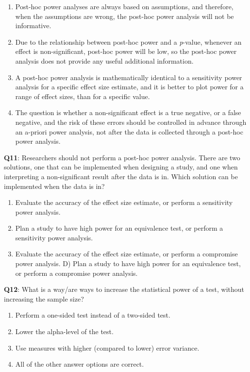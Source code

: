 \documentclass[
  oneside]{krantz}
\providecommand{\tightlist}{%
  \setlength{\itemsep}{0pt}\setlength{\parskip}{0pt}}
\begin{document}
\begin{enumerate}
\def\labelenumi{\Alph{enumi})}
\tightlist
\item
  Post-hoc power analyses are always based on assumptions, and therefore, when the assumptions are wrong, the post-hoc power analysis will not be informative.
\item
  Due to the relationship between post-hoc power and a \emph{p}-value, whenever an effect is non-significant, post-hoc power will be low, so the post-hoc power analysis does not provide any useful additional information.
\item
  A post-hoc power analysis is mathematically identical to a sensitivity power analysis for a specific effect size estimate, and it is better to plot power for a range of effect sizes, than for a specific value.
\item
  The question is whether a non-significant effect is a true negative, or a false negative, and the risk of these errors should be controlled in advance through an a-priori power analysis, not after the data is collected through a post-hoc power analysis.
\end{enumerate}

\textbf{Q11}: Researchers should not perform a post-hoc power analysis. There are two solutions, one that can be implemented when designing a study, and one when interpreting a non-significant result after the data is in. Which solution can be implemented when the data is in?

\begin{enumerate}
\def\labelenumi{\Alph{enumi})}
\tightlist
\item
  Evaluate the accuracy of the effect size estimate, or perform a sensitivity power analysis.
\item
  Plan a study to have high power for an equivalence test, or perform a sensitivity power analysis.
\item
  Evaluate the accuracy of the effect size estimate, or perform a compromise power analysis. D) Plan a study to have high power for an equivalence test, or perform a compromise power analysis.
\end{enumerate}

\textbf{Q12}: What is a way/are ways to increase the statistical power of a test, without increasing the sample size?

\begin{enumerate}
\def\labelenumi{\Alph{enumi})}
\tightlist
\item
  Perform a one-sided test instead of a two-sided test.
\item
  Lower the alpha-level of the test.
\item
  Use measures with higher (compared to lower) error variance.
\item
  All of the other answer options are correct.
\end{enumerate}
\end{document}
